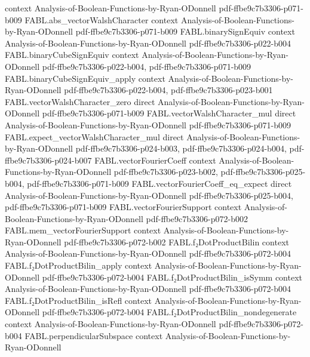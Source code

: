\begin{theorem}
  {context}
  {Analysis-of-Boolean-Functions-by-Ryan-ODonnell}
  {pdf-ffbe9c7b3306-p071-b009}
\proofstep
  {FABL.abs_vectorWalshCharacter}
  {context}
  {Analysis-of-Boolean-Functions-by-Ryan-ODonnell}
  {pdf-ffbe9c7b3306-p071-b009}
\proofstep
  {FABL.binarySignEquiv}
  {context}
  {Analysis-of-Boolean-Functions-by-Ryan-ODonnell}
  {pdf-ffbe9c7b3306-p022-b004}
\proofstep
  {FABL.binaryCubeSignEquiv}
  {context}
  {Analysis-of-Boolean-Functions-by-Ryan-ODonnell}
  {pdf-ffbe9c7b3306-p022-b004,
    pdf-ffbe9c7b3306-p071-b009}
\proofstep
  {FABL.binaryCubeSignEquiv_apply}
  {context}
  {Analysis-of-Boolean-Functions-by-Ryan-ODonnell}
  {pdf-ffbe9c7b3306-p022-b004,
    pdf-ffbe9c7b3306-p023-b001}
\proofstep
  {FABL.vectorWalshCharacter_zero}
  {direct}
  {Analysis-of-Boolean-Functions-by-Ryan-ODonnell}
  {pdf-ffbe9c7b3306-p071-b009}
\proofstep
  {FABL.vectorWalshCharacter_mul}
  {direct}
  {Analysis-of-Boolean-Functions-by-Ryan-ODonnell}
  {pdf-ffbe9c7b3306-p071-b009}
\proofstep
  {FABL.expect_vectorWalshCharacter_mul}
  {direct}
  {Analysis-of-Boolean-Functions-by-Ryan-ODonnell}
  {pdf-ffbe9c7b3306-p024-b003,
    pdf-ffbe9c7b3306-p024-b004,
    pdf-ffbe9c7b3306-p024-b007}
\proofstep
  {FABL.vectorFourierCoeff}
  {context}
  {Analysis-of-Boolean-Functions-by-Ryan-ODonnell}
  {pdf-ffbe9c7b3306-p023-b002,
    pdf-ffbe9c7b3306-p025-b004,
    pdf-ffbe9c7b3306-p071-b009}
\proofstep
  {FABL.vectorFourierCoeff_eq_expect}
  {direct}
  {Analysis-of-Boolean-Functions-by-Ryan-ODonnell}
  {pdf-ffbe9c7b3306-p025-b004,
    pdf-ffbe9c7b3306-p071-b009}
\proofstep
  {FABL.vectorFourierSupport}
  {context}
  {Analysis-of-Boolean-Functions-by-Ryan-ODonnell}
  {pdf-ffbe9c7b3306-p072-b002}
\proofstep
  {FABL.mem_vectorFourierSupport}
  {context}
  {Analysis-of-Boolean-Functions-by-Ryan-ODonnell}
  {pdf-ffbe9c7b3306-p072-b002}
\proofstep
  {FABL.f₂DotProductBilin}
  {context}
  {Analysis-of-Boolean-Functions-by-Ryan-ODonnell}
  {pdf-ffbe9c7b3306-p072-b004}
\proofstep
  {FABL.f₂DotProductBilin_apply}
  {context}
  {Analysis-of-Boolean-Functions-by-Ryan-ODonnell}
  {pdf-ffbe9c7b3306-p072-b004}
\proofstep
  {FABL.f₂DotProductBilin_isSymm}
  {context}
  {Analysis-of-Boolean-Functions-by-Ryan-ODonnell}
  {pdf-ffbe9c7b3306-p072-b004}
\proofstep
  {FABL.f₂DotProductBilin_isRefl}
  {context}
  {Analysis-of-Boolean-Functions-by-Ryan-ODonnell}
  {pdf-ffbe9c7b3306-p072-b004}
\proofstep
  {FABL.f₂DotProductBilin_nondegenerate}
  {context}
  {Analysis-of-Boolean-Functions-by-Ryan-ODonnell}
  {pdf-ffbe9c7b3306-p072-b004}
\proofstep
  {FABL.perpendicularSubspace}
  {context}
  {Analysis-of-Boolean-Functions-by-Ryan-ODonnell}

\end{theorem}
